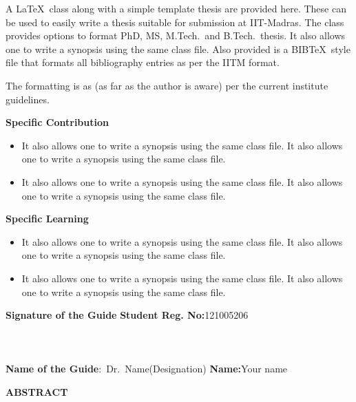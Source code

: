 \documentclass[a4paper, 12pt, oneside]{sastra}
\begin{document}
	\vspace*{24pt}
	
	\noindent A \LaTeX\ class along with a simple template thesis are provided here.  These can be used to easily write a thesis suitable for submission at IIT-Madras.  The class provides options to format PhD, MS, M.Tech.\ and B.Tech.\ thesis.  It also allows one to write a synopsis using the same class file.  Also provided is a BIB\TeX\ style file that formats all bibliography entries as per the IITM format.
	
	The formatting is as (as far as the author is aware) per the current institute guidelines.
	
	\noindent \textbf{Specific Contribution}
	\begin{itemize}
		\item It also allows one to write a synopsis using the same class file. It also allows one to write a synopsis using the same class file.
		\item It also allows one to write a synopsis using the same class file. It also allows one to write a synopsis using the same class file.
	\end{itemize}
	\noindent \textbf{Specific Learning}
	\begin{itemize}
		\item It also allows one to write a synopsis using the same class file. It also allows one to write a synopsis using the same class file.
		\item It also allows one to write a synopsis using the same class file. It also allows one to write a synopsis using the same class file.
	\end{itemize}
	
	\vspace*{24pt}
	
	\noindent \textbf{Signature of the Guide} \hspace*{66mm} \textbf{Student Reg. No:}121005206\\
		\\
	\\
	\\
\noindent \textbf{Name of the Guide}:~Dr.~Name(Designation) \hspace*{31mm} \textbf{Name:}Your name
\pagebreak
	
	\begin{center}
		\Large{{\textbf{ABSTRACT}}}
	\end{center}
	
\end{document}

